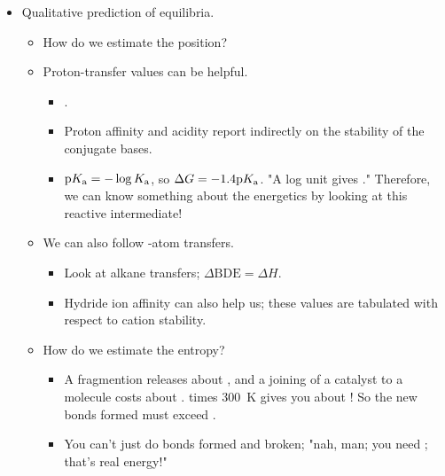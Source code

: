 \documentclass[../notes.tex]{subfiles}
\begin{document}
\begin{itemize}
\begin{itemize}
    \end{itemize}
    \item Qualitative prediction of equilibria.
    \begin{itemize}
        \item How do we estimate the position?
        \item Proton-transfer values can be helpful.
        \begin{itemize}
            \item {}.
            \item Proton affinity and acidity report indirectly on the stability of the conjugate bases.
            \item $\textup{p}K_\textup{a}=-\log K_\textup{a}$, so $\Delta G=-1.4\textup{p}K_\textup{a}$. "A log unit gives ." Therefore, we can know something about the energetics by looking at this reactive intermediate!
        \end{itemize}
        \item We can also follow -atom transfers.
        \begin{itemize}
            \item Look at alkane transfers; $\Delta\text{BDE}=\Delta H$.
            \item Hydride ion affinity can also help us; these values are tabulated with respect to cation stability.
        \end{itemize}
        \item How do we estimate the entropy?
        \begin{itemize}
            \item A fragmention releases about , and a joining of a catalyst to a molecule costs about .  times \SI{300}{\kelvin} gives you about ! So the new bonds formed must exceed .
            \item You can't just do bonds formed and broken; "nah, man; you need ; that's real energy!"
        \end{itemize}
    \end{itemize}
\end{itemize}
\newpage
\end{document}
